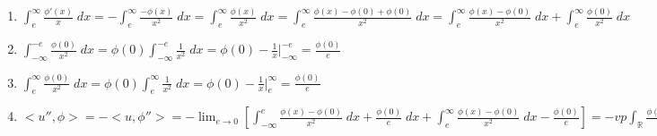 \begin{enumerate}
  \item $\int_{e}^{\infty} \frac{\phi'(x)}{x} \; dx = - \int_{e}^{\infty} \frac{-\phi(x)}{x^2} \; dx = \int_{e}^{\infty} \frac{\phi(x)}{x^2} \; dx = \int_{e}^{\infty} \frac{\phi(x) - \phi(0) + \phi(0)}{x^2} \; dx = \int_{e}^{\infty} \frac{\phi(x) - \phi(0)}{x^2} \; dx + \int_{e}^{\infty} \frac{\phi(0)}{x^2} \; dx$
  \item $\int_{-\infty}^{-e} \frac{\phi(0)}{x^2} \; dx = \phi(0) \int_{-\infty}^{-e} \frac{1}{x^2} \; dx = \phi(0) -\frac{1}{x} |_{-\infty}^{-e} = \frac{\phi(0)}{e}$
  \item $\int_{e}^{\infty} \frac{\phi(0)}{x^2} \; dx = \phi(0) \int_{e}^{\infty} \frac{1}{x^2} \; dx = \phi(0) -\frac{1}{x} |_{e}^{\infty} = \frac{\phi(0)}{e}$
  \item $<u'', \phi> = - <u, \phi''> = -\lim_{e \to 0} \left[ \int_{-\infty}^{e} \frac{\phi(x) - \phi(0)}{x^2} \; dx + \frac{\phi(0)}{e} \; dx + \int_{e}^{\infty} \frac{\phi(x) - \phi(0)}{x^2} \; dx - \frac{\phi(0)}{e} \right] = - vp \int_{\mathbb{R}} \frac{\phi(x) - \phi(0)}{x^2} \; dx$
\end{enumerate}

